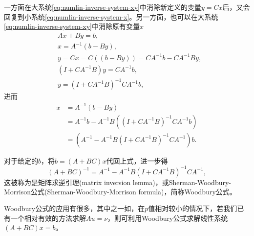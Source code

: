 \begin{subappendices}
一方面在大系统\eqref{eq:numlin-inverse-system-xy}中消除新定义的变量$y=C x$后，又会回复到小系统\eqref{eq:numlin-inverse-system-x}。另一方面，也可以在大系统\eqref{eq:numlin-inverse-system-xy}中消除原有变量$x$
\begin{equation*}
  \begin{split}
    & A x + B y = b, \\
    & x = A^{-1} \left( b - B y \right), \\
    & y = C x = C \left( \left( b - B y \right) \right) = C A^{-1} b - C A^{-1} B y, \\
    & \left( I + C A^{-1} B \right) y = C A^{-1} b, \\
    & y = \left( I + CA^{-1} B \right)^{-1} C A^{-1} b,
  \end{split}
\end{equation*}
进而
\begin{equation}
  \label{eq:numlin-inverse-system-y}
\begin{split}
  x & = A^{-1} \left( b - B y \right) \\
  & = A^{-1} b - A^{-1} B
  \left(
  \left( I + C A^{-1} B \right)^{-1} C A^{-1} b
  \right) \\
  & = \left(
  A^{-1} - A^{-1} B
  \left( I + C A^{-1} B \right)^{-1}
  C A^{-1}
  \right)
  b.
\end{split}
\end{equation}

对于给定的$b$，将$b = \left(A + B C \right) x$代回上式，进一步得
\begin{equation}
  \label{eq:matrix-inversion-woodbury-matrix-identity}
  \left( A + BC \right)^{-1}  = A^{-1} - A^{-1} B
  \left( I + C A^{-1} B \right)^{-1}
  C A^{-1},
\end{equation}
这被称为是矩阵求逆引理(matrix inversion lemma)，或Sherman-Woodbury-Morrison公式(Sherman-Woodbury-Morrison formula)，简称Woodbury公式。

Woodbury公式的应用有很多，其中之一如，在$p$值相对较小的情况下，若我们已有一个相对有效的方法求解$A u = \nu$，则可利用Woodbury公式求解线性系统$\left( A + BC \right) x = b$。


\end{subappendices}
